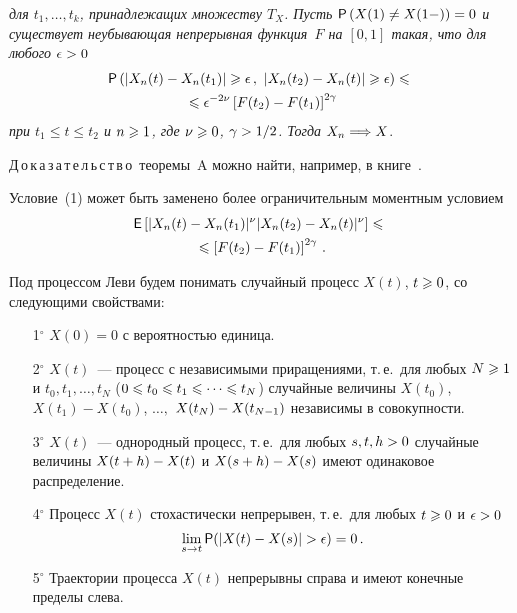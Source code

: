 \begin{multicols}{2}
\noindent
\textit{для $t_1,\ldots ,t_k$, принадлежащих множеству $T_X$. Пусть ${\sf
P}\left(X(1)\hm\neq X(1-)\right)\hm=0$ и существует неубывающая непрерывная
функция~$F$ на $[0,1]$ такая, что для любого $\epsilon\hm>0$}
\begin{multline}
{\sf P}\left(|X_n(t)-X_n(t_1)|\geqslant\epsilon\,,\
|X_n(t_2)-X_n(t)|\geqslant\epsilon\right)
\leqslant{}\\
{}\leqslant\epsilon^{-2\nu}\left[F(t_2)-F(t_1)\right]^{2\gamma}
\label{e1-zaks}
\end{multline}
\textit{при $t_1\leqslant t\leqslant t_2$ и $n\hm\geqslant1$, где $\nu\hm\geqslant 0$, $\gamma\hm>1/2$.
Тогда} $X_n\hm\Longrightarrow X$.

\smallskip

\noindent
Д\,о\,к\,а\,з\,а\,т\,е\,л\,ь\,с\,т\,в\,о\ теоремы~A можно найти, например, в
книге~\cite{Billingsley}.

\smallskip

Условие~(1) может быть заменено более ограничительным моментным
условием
\begin{multline*}
{\sf E}\left[|X_n(t)-X_n(t_1)|^{\nu}|X_n(t_2)-X_n(t)|^{\nu}\right]
\leqslant{}\\
{}\leqslant\left[F(t_2)-F(t_1)\right]^{2\gamma}\,.
\end{multline*}

Под процессом Леви будем понимать случайный процесс $X(t)$, $t\hm\geqslant0$,
со следующими свойствами:
\begin{enumerate}
\item[1$^{\circ}$] $X(0)=0$ с вероятностью единица.
\item[2$^{\circ}$] $X(t)$~--- процесс с независимыми приращениями, т.\,е.\ для любых
$N\hm\geqslant1$ и $t_0,t_1,\dots ,t_N$ ($0\hm\leqslant t_0\hm\leqslant t_1\hm\leqslant\cdots \leqslant t_N$)
случайные величины $X(t_0)$, $X(t_1)-X(t_0)$, $\dots ,$
$X(t_N)\hm-X(t_{N-1})$ независимы в совокупности.
\item[3$^{\circ}$] $X(t)$~--- однородный процесс, т.\,е.\ для любых $s,t,h\hm>0$ случайные
величины $X(t+h)\hm-X(t)$ и $X(s+h)\hm-X(s)$ имеют одинаковое
распределение.
\item[4$^{\circ}$] Процесс $X(t)$ стохастически непрерывен, т.\,е.\ для любых $t\hm\geqslant0$ и
$\epsilon\hm>0$
$$
\lim\limits_{s\to t}{\sf P}(|X(t)-X(s)|>\epsilon)=0\,.
$$
\item[5$^{\circ}$] Траектории процесса $X(t)$ непрерывны справа и имеют конечные пределы
слева.
\end{enumerate}


\end{multicols}
